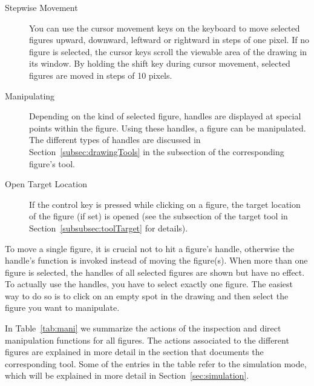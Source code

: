 \begin{description}
\item[Stepwise Movement] You can use the cursor movement keys on the
keyboard to move selected figures upward, downward, leftward or
rightward in steps of one pixel.
If no figure is selected, the cursor keys scroll the viewable area of the
drawing in its window.
 By holding the shift key during cursor movement,
selected figures are moved in steps of 10 pixels.
\item[Manipulating] Depending on the kind of selected figure, handles
are displayed at special points within the figure. Using these handles, a
figure can be manipulated. The different types of handles are discussed in
Section~\ref{subsec:drawingTools} in the subsection of the corresponding
figure's tool.
\item[Open Target Location] If the control key is pressed while clicking on a
figure, the target location of the figure (if set) is opened (see 
the subsection of the target tool in Section~\ref{subsubsec:toolTarget} for details).
\end{description}

To move a single figure, it is crucial not to hit a figure's handle,
otherwise the handle's function is invoked instead of moving the
figure(s).
When more than one figure is selected, the handles of all selected
figures are shown but have no effect.
To actually use the handles, you have to select exactly one figure.
The easiest way to do so is to click on an empty spot in the drawing
and then select the figure you want to manipulate.

In Table~\ref{tab:mani} we summarize the actions of
the inspection and direct manipulation functions
for all figures. The actions associated to the different figures
are explained in more detail
in the section that documents the corresponding tool.
Some of the entries in the table refer to
the simulation mode, which will be explained in more detail
in Section~\ref{sec:simulation}.

